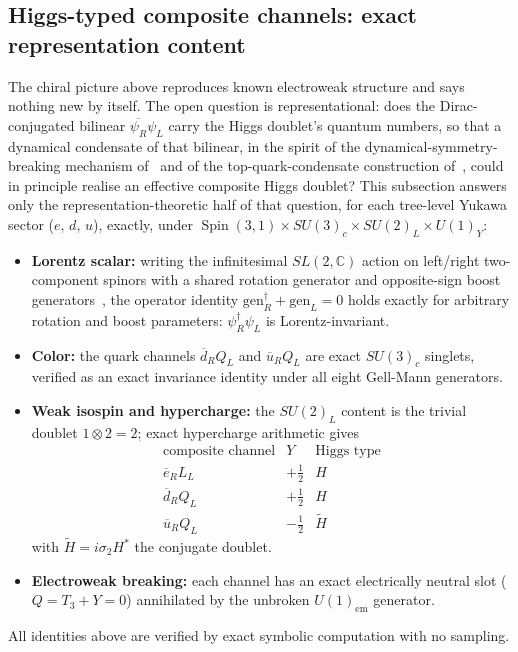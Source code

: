\documentclass[11pt,a4paper]{article}
\begin{document}
\subsection{Higgs-typed composite channels: exact representation content}
\label{sec:compositegate}

The chiral picture above reproduces known electroweak structure and says nothing new by itself.
The open question is representational: does the Dirac-conjugated bilinear $\overline{\psi_R} \psi_L$
carry the Higgs doublet's quantum numbers, so that a dynamical condensate of that bilinear, in the
spirit of the dynamical-symmetry-breaking mechanism of~\cite{NambuJonaLasinio1961} and of the
top-quark-condensate construction of~\cite{BardeenHillLindner1990}, could in principle realise an
effective composite Higgs doublet?
This subsection answers only the representation-theoretic half of that question, for each tree-level
Yukawa sector ($e$, $d$, $u$), exactly, under
$\operatorname{Spin}(3,1) \times SU(3)_c \times SU(2)_L \times U(1)_Y$:
\begin{itemize}
\item \textbf{Lorentz scalar:} writing the infinitesimal $SL(2,\mathbb{C})$ action on left/right
  two-component spinors with a shared rotation generator and opposite-sign boost
  generators~\cite{DreinerHaberMartin2010}, the operator identity
  $\mathrm{gen}_R^\dagger + \mathrm{gen}_L = 0$ holds exactly for arbitrary rotation and boost
  parameters: $\psi_R^\dagger \psi_L$ is Lorentz-invariant.
\item \textbf{Color:} the quark channels $\overline{d}_R Q_L$ and $\overline{u}_R Q_L$ are exact
  $SU(3)_c$ singlets, verified as an exact invariance identity under all eight Gell-Mann generators.
\item \textbf{Weak isospin and hypercharge:} the $SU(2)_L$ content is the trivial doublet
  $1 \otimes 2 = 2$; exact hypercharge arithmetic gives
  \begin{equation}
  \begin{array}{c|c|c}
  \text{composite channel} & Y & \text{Higgs type} \\ \hline
  \overline{e}_R L_L & +\tfrac12 & H \\
  \overline{d}_R Q_L & +\tfrac12 & H \\
  \overline{u}_R Q_L & -\tfrac12 & \widetilde{H}
  \end{array}
  \label{eq:higgstable}
  \end{equation}
  with $\widetilde{H} = i \sigma_2 H^*$ the conjugate doublet.
\item \textbf{Electroweak breaking:} each channel has an exact electrically neutral slot
  ($Q = T_3 + Y = 0$) annihilated by the unbroken $U(1)_{\mathrm{em}}$ generator.
\end{itemize}
All identities above are verified by exact symbolic computation with no sampling.
\end{document}
